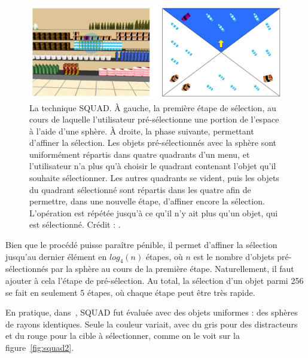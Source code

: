 	\begin{figure}[H]
		\centering
		\includegraphics[width=\textwidth]{figures/ch2/squad}
		\caption[Fonctionnement de la technique SQUAD]{La technique SQUAD. À gauche, la première étape de sélection, au cours de laquelle l'utilisateur pré-sélectionne une portion de l'espace à l'aide d'une sphère. À droite, la phase suivante, permettant d'affiner la sélection. Les objets pré-sélectionnés avec la sphère sont uniformément répartis dans quatre quadrants d'un menu, et l'utilisateur n'a plus qu'à choisir le quadrant contenant l'objet qu'il souhaite sélectionner. Les autres quadrants se vident, puis les objets du quadrant sélectionné sont répartis dans les quatre afin de permettre, dans une nouvelle étape, d'affiner encore la sélection. L'opération est répétée jusqu'à ce qu'il n'y ait plus qu'un objet, qui est sélectionné. Crédit : \cite{kopper2011rapid}.}
		\label{fig:squad}
	\end{figure}
	
	Bien que le procédé puisse paraître pénible, il permet d'affiner la sélection jusqu'au dernier élément en $log_{4}(n)$ étapes, où $n$ est le nombre d'objets pré-sélectionnés par la sphère au cours de la première étape. Naturellement, il faut ajouter à cela l'étape de pré-sélection. Au total, la sélection d'un objet parmi 256 se fait en seulement 5 étapes, où chaque étape peut être très rapide.
	
	En pratique, dans~\cite{kopper2011rapid}, SQUAD fut évaluée avec des objets uniformes : des sphères de rayons identiques. Seule la couleur variait, avec du gris pour des distracteurs et du rouge pour la cible à sélectionner, comme on le voit sur la figure~\ref{fig:squad2}. 
	
